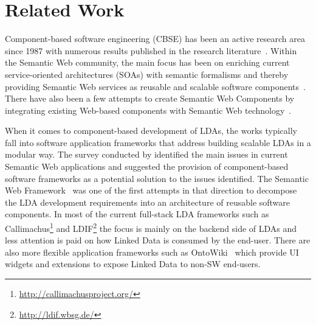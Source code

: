 \documentclass{llncs}
\begin{document}
\section{Related Work}
Component-based software engineering (CBSE) has been an active research area since 1987 with numerous results published in the research literature~\cite{Vale2015}.
Within the Semantic Web community, the main focus has been on enriching current service-oriented architectures (SOAs) with semantic formalisms and thereby providing Semantic Web services as reusable and scalable software components~\cite{sws2015}.
There have also been a few attempts to create Semantic Web Components by integrating existing Web-based components with Semantic Web technology~\cite{pahl2011,HartigKF08}.

When it comes to component-based development of LDAs, the works typically fall into
software application frameworks that address building scalable LDAs in a modular way.
The survey conducted by \cite{SWASurvey09} identified the main issues in current Semantic Web applications and suggested the provision of component-based software frameworks as a potential solution to the issues identified.
The Semantic Web Framework~\cite{swFramework2008} was one of the first attempts in that direction to decompose the LDA development requirements into an architecture of reusable software components.
In most of the current full-stack LDA frameworks such as Callimachus\footnote{\url{http://callimachusproject.org/}} and LDIF\footnote{\url{http://ldif.wbsg.de/}} the focus is mainly on the backend side of LDAs and less attention is paid on how Linked Data is consumed by the end-user.
There are also more flexible application frameworks such as OntoWiki~\cite{ontowiki-swj} which provide UI widgets and extensions to expose Linked Data to non-SW end-users.
\end{document}
